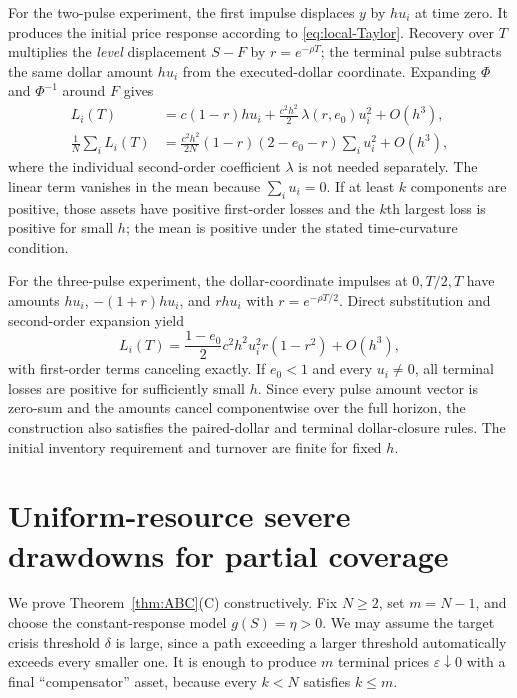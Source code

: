 \documentclass[review,hidelinks,onefignum,onetabnum]{siamonline250211}
\begin{document}
For the two-pulse experiment, the first impulse displaces $y$ by $hu_i$ at time zero. It produces the initial price response according to \eqref{eq:local-Taylor}. Recovery over $T$ multiplies the \emph{level} displacement $S-F$ by $r=e^{-\rho T}$; the terminal pulse subtracts the same dollar amount $hu_i$ from the executed-dollar coordinate. Expanding $\Phi$ and $\Phi^{-1}$ around $F$ gives
\begin{align}\label{eq:local-two}
L_i(T)&=c(1-r)hu_i+\frac{c^2h^2}{2}\,\lambda(r,e_0)u_i^2+O(h^3),\\
\frac1N\sum_i L_i(T)&=\frac{c^2h^2}{2N}(1-r)(2-e_0-r)\sum_i u_i^2+O(h^3),\nonumber
\end{align}
where the individual second-order coefficient $\lambda$ is not needed separately. The linear term vanishes in the mean because $\sum_i u_i=0$. If at least $k$ components are positive, those assets have positive first-order losses and the $k$th largest loss is positive for small $h$; the mean is positive under the stated time-curvature condition.

For the three-pulse experiment, the dollar-coordinate impulses at $0,T/2,T$ have amounts $hu_i$, $-(1+r)hu_i$, and $rhu_i$ with $r=e^{-\rho T/2}$. Direct substitution and second-order expansion yield
\begin{equation}\label{eq:local-three}
L_i(T)=\frac{1-e_0}{2}c^2h^2u_i^2r(1-r^2)+O(h^3),
\end{equation}
with first-order terms canceling exactly. If $e_0<1$ and every $u_i\ne0$, all terminal losses are positive for sufficiently small $h$. Since every pulse amount vector is zero-sum and the amounts cancel componentwise over the full horizon, the construction also satisfies the paired-dollar and terminal dollar-closure rules. The initial inventory requirement and turnover are finite for fixed $h$.

\section{Uniform-resource severe drawdowns for partial coverage}\label{app:severe}
We prove Theorem~\ref{thm:ABC}(C) constructively. Fix $N\ge2$, set $m=N-1$, and choose the constant-response model $g(S)=\eta>0$. We may assume the target crisis threshold $\delta$ is large, since a path exceeding a larger threshold automatically exceeds every smaller one. It is enough to produce $m$ terminal prices $\varepsilon\downarrow0$ with a final ``compensator'' asset, because every $k<N$ satisfies $k\le m$.
\end{document}
